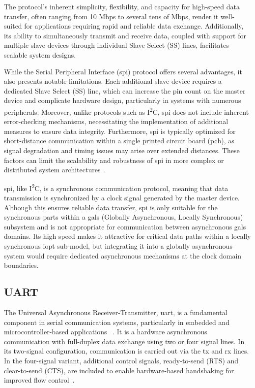 The protocol’s inherent simplicity, flexibility, and capacity for high-speed data transfer, often ranging from 10 Mbps to several tens of Mbps, render it well-suited for applications requiring rapid and reliable data exchange. Additionally, its ability to simultaneously transmit and receive data, coupled with support for multiple slave devices through individual Slave Select (SS) lines, facilitates scalable system designs.

While the Serial Peripheral Interface (\gls{spi}) protocol offers several advantages, it also presents notable limitations. Each additional slave device requires a dedicated Slave Select (SS) line, which can increase the pin count on the master device and complicate hardware design, particularly in systems with numerous peripherals. Moreover, unlike protocols such as  I\textsuperscript{2}C, \gls{spi} does not include inherent error-checking mechanisms, necessitating the implementation of additional measures to ensure data integrity. Furthermore, \gls{spi} is typically optimized for short-distance communication within a single printed circuit board (\gls{pcb}), as signal degradation and timing issues may arise over extended distances. These factors can limit the scalability and robustness of \gls{spi} in more complex or distributed system architectures~\cite{spisite2}.


\gls{spi}, like I\textsuperscript{2}C, is a synchronous communication protocol, meaning that data transmission is synchronized by a clock signal generated by the master device. Although this ensures reliable data transfer, \gls{spi} is only suitable for the synchronous parts within a \gls{gals} (Globally Asynchronous, Locally Synchronous) subsystem and is not appropriate for communication between asynchronous \gls{gals} domains. Its high speed makes it attractive for critical data paths within a locally synchronous \gls{iopt} sub-model, but integrating it into a globally asynchronous system would require dedicated asynchronous mechanisms at the clock domain boundaries.

\subsection{UART}
\label{sub:uart}

The Universal Asynchronous Receiver-Transmitter, \gls{uart}, is a fundamental component in serial communication systems, particularly in embedded and microcontroller-based applications ~\cite{UARTwiki}. It is a hardware asynchronous communication with full-duplex data exchange using two or four signal lines. In its two-signal configuration, communication is carried out via the \gls{tx} and \gls{rx} lines. In the four-signal variant, additional control signals, ready-to-send (RTS) and clear-to-send (CTS), are included to enable hardware-based handshaking for improved flow control~\cite{Rao2021}.

